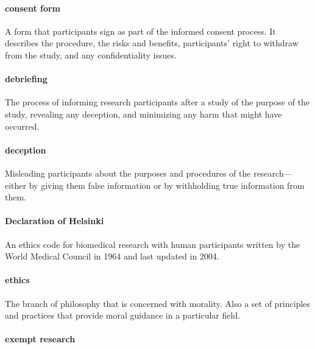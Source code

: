 \documentclass[
]{krantz}
\begin{document}
\paragraph*{consent form}\label{consent-form}

A form that participants sign as part of the informed consent process. It describes the procedure, the risks and benefits, participants' right to withdraw from the study, and any confidentiality issues.

\paragraph*{debriefing}\label{debriefing-1}

The process of informing research participants after a study of the purpose of the study, revealing any deception, and minimizing any harm that might have occurred.

\paragraph*{deception}\label{deception-1}

Misleading participants about the purposes and procedures of the research---either by giving them false information or by withholding true information from them.

\paragraph*{Declaration of Helsinki}\label{declaration-of-helsinki}

An ethics code for biomedical research with human participants written by the World Medical Council in 1964 and last updated in 2004.

\paragraph*{ethics}\label{ethics}

The branch of philosophy that is concerned with morality. Also a set of principles and practices that provide moral guidance in a particular field.

\paragraph*{exempt research}\label{exempt-research}
\end{document}
